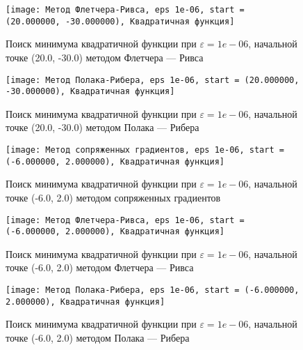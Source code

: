             \begin{figure}[H]
	        \centering
	        \texttt{[image: Метод Флетчера-Ривса, eps 1e-06, start = (20.000000, -30.000000), Квадратичная функция]}%
	        \caption{Поиск минимума квадратичной функции при $\varepsilon = 1e-06$, начальной точке (20.0, -30.0) методом Флетчера --- Ривса}
	        \vspace*{-1.2cm}
            \end{figure}
            
            \begin{figure}[H]
	        \centering
	        \texttt{[image: Метод Полака-Рибера, eps 1e-06, start = (20.000000, -30.000000), Квадратичная функция]}%
	        \caption{Поиск минимума квадратичной функции при $\varepsilon = 1e-06$, начальной точке (20.0, -30.0) методом Полака --- Рибера}
	        \vspace*{-1.2cm}
            \end{figure}
            
            \begin{figure}[H]
	        \centering
	        \texttt{[image: Метод сопряженных градиентов, eps 1e-06, start = (-6.000000, 2.000000), Квадратичная функция]}%
	        \caption{Поиск минимума квадратичной функции при $\varepsilon = 1e-06$, начальной точке (-6.0, 2.0) методом сопряженных градиентов}
	        \vspace*{-1.2cm}
            \end{figure}
            
            \begin{figure}[H]
	        \centering
	        \texttt{[image: Метод Флетчера-Ривса, eps 1e-06, start = (-6.000000, 2.000000), Квадратичная функция]}%
	        \caption{Поиск минимума квадратичной функции при $\varepsilon = 1e-06$, начальной точке (-6.0, 2.0) методом Флетчера --- Ривса}
	        \vspace*{-1.2cm}
            \end{figure}
            
            \begin{figure}[H]
	        \centering
	        \texttt{[image: Метод Полака-Рибера, eps 1e-06, start = (-6.000000, 2.000000), Квадратичная функция]}%
	        \caption{Поиск минимума квадратичной функции при $\varepsilon = 1e-06$, начальной точке (-6.0, 2.0) методом Полака --- Рибера}
	        \vspace*{-1.2cm}
            \end{figure}
